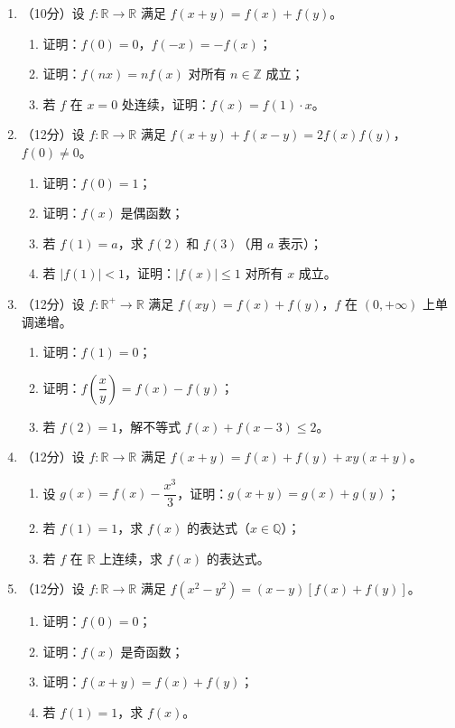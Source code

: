 \documentclass[12pt, a4paper]{ctexart}
\begin{document}
\begin{enumerate}[resume]
\item （10分）设 $f: \mathbb{R} \to \mathbb{R}$ 满足 $f(x+y) = f(x) + f(y)$。
\begin{enumerate}[label=(\arabic*)]
\item 证明：$f(0) = 0$，$f(-x) = -f(x)$；
\item 证明：$f(nx) = nf(x)$ 对所有 $n \in \mathbb{Z}$ 成立；
\item 若 $f$ 在 $x = 0$ 处连续，证明：$f(x) = f(1) \cdot x$。
\end{enumerate}

\item （12分）设 $f: \mathbb{R} \to \mathbb{R}$ 满足 $f(x+y) + f(x-y) = 2f(x)f(y)$，$f(0) \neq 0$。
\begin{enumerate}[label=(\arabic*)]
\item 证明：$f(0) = 1$；
\item 证明：$f(x)$ 是偶函数；
\item 若 $f(1) = a$，求 $f(2)$ 和 $f(3)$（用 $a$ 表示）；
\item 若 $|f(1)| < 1$，证明：$|f(x)| \leqslant 1$ 对所有 $x$ 成立。
\end{enumerate}

\item （12分）设 $f: \mathbb{R}^+ \to \mathbb{R}$ 满足 $f(xy) = f(x) + f(y)$，$f$ 在 $(0, +\infty)$ 上单调递增。
\begin{enumerate}[label=(\arabic*)]
\item 证明：$f(1) = 0$；
\item 证明：$f\left(\dfrac{x}{y}\right) = f(x) - f(y)$；
\item 若 $f(2) = 1$，解不等式 $f(x) + f(x-3) \leqslant 2$。
\end{enumerate}

\item （12分）设 $f: \mathbb{R} \to \mathbb{R}$ 满足 $f(x+y) = f(x) + f(y) + xy(x+y)$。
\begin{enumerate}[label=(\arabic*)]
\item 设 $g(x) = f(x) - \dfrac{x^3}{3}$，证明：$g(x+y) = g(x) + g(y)$；
\item 若 $f(1) = 1$，求 $f(x)$ 的表达式（$x \in \mathbb{Q}$）；
\item 若 $f$ 在 $\mathbb{R}$ 上连续，求 $f(x)$ 的表达式。
\end{enumerate}

\item （12分）设 $f: \mathbb{R} \to \mathbb{R}$ 满足 $f(x^2 - y^2) = (x - y)[f(x) + f(y)]$。
\begin{enumerate}[label=(\arabic*)]
\item 证明：$f(0) = 0$；
\item 证明：$f(x)$ 是奇函数；
\item 证明：$f(x+y) = f(x) + f(y)$；
\item 若 $f(1) = 1$，求 $f(x)$。
\end{enumerate}


\end{enumerate}
\end{document}

